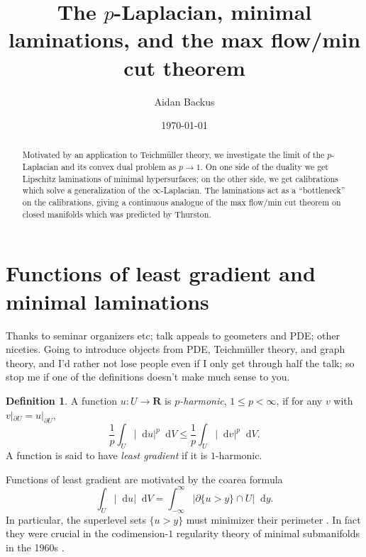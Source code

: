 \documentclass[reqno,11pt]{amsart}
\title{The $p$-Laplacian, minimal laminations, and the max flow/min cut theorem}
\author{Aidan Backus}
\date{\today}
\newcommand{\RR}{\mathbf{R}}
\newcommand*\dif{\mathop{}\!\mathrm{d}}
\newcommand{\dfn}[1]{\emph{#1}\index{#1}}
\theoremstyle{definition}
\newtheorem{definition}[theorem]{Definition}
\numberwithin{equation}{section}
\begin{document}
\begin{abstract}
Motivated by an application to Teichm\"uller theory, we investigate the limit of the $p$-Laplacian and its convex dual problem as $p \to 1$.
On one side of the duality we get Lipschitz laminations of minimal hypersurfaces; on the other side, we get calibrations which solve a generalization of the $\infty$-Laplacian.
The laminations act as a ``bottleneck'' on the calibrations, giving a continuous analogue of the max flow/min cut theorem on closed manifolds which was predicted by Thurston.
\end{abstract}

\maketitle

\section{Functions of least gradient and minimal laminations}
Thanks to seminar organizers etc; talk appeals to geometers and PDE; other niceties.
Going to introduce objects from PDE, Teichm\"uller theory, and graph theory, and I'd rather not lose people even if I only get through half the talk; so stop me if one of the definitions doesn't make much sense to you.

\begin{definition}
A function $u: U \to \RR$ is \dfn{$p$-harmonic}, $1 \leq p < \infty$, if for any $v$ with $v|_{\partial U} = u|_{\partial U}$,
$$\frac{1}{p} \int_U |\dif u|^p \dif V \leq \frac{1}{p} \int_U |\dif v|^p \dif V.$$
A function is said to have \dfn{least gradient} if it is $1$-harmonic.
\end{definition}


Functions of least gradient are motivated by the coarea formula 
$$\int_U |\dif u| \dif V = \int_{-\infty}^\infty |\partial \{u > y\} \cap U| \dif y.$$
In particular, the superlevel sets $\{u > y\}$ must minimizer their perimeter \cite{BOMBIERI1969}.
In fact they were crucial in the codimension-$1$ regularity theory of minimal submanifolds in the 1960s \cite{BOMBIERI1969,Miranda66}.
\end{document}
